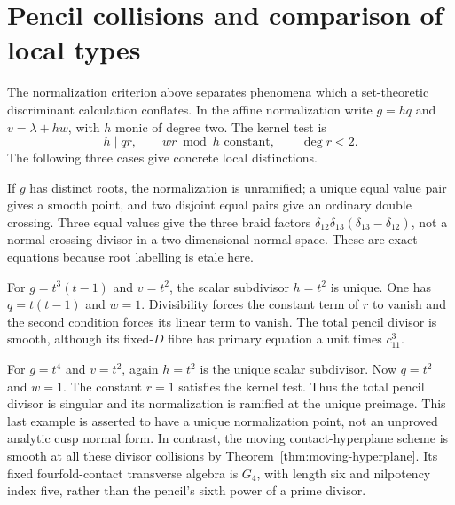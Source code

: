 \section{Pencil collisions and comparison of local types}
\label{sec:pencil-collision-types}
The normalization criterion above separates phenomena which a
set-theoretic discriminant calculation conflates. In the affine
normalization write $g=hq$ and $v=\lambda+hw$, with $h$ monic of
degree two. The kernel test is
\[
 h\mid qr,\qquad wr\bmod h\text{ constant},\qquad\deg r<2.
\]
The following three cases give concrete local distinctions.

If $g$ has distinct roots, the normalization is unramified; a unique
equal value pair gives a smooth point, and two disjoint equal pairs
give an ordinary double crossing. Three equal values give the three
braid factors $\delta_{12}\delta_{13}(\delta_{13}-\delta_{12})$,
not a normal-crossing divisor in a two-dimensional normal space.
These are exact equations because root labelling is etale here.

For $g=t^3(t-1)$ and $v=t^2$, the scalar subdivisor $h=t^2$ is unique.
One has $q=t(t-1)$ and $w=1$. Divisibility forces the constant term
of $r$ to vanish and the second condition forces its linear term to
vanish. The total pencil divisor is smooth, although its fixed-$D$
fibre has primary equation a unit times $c_{11}^3$.

For $g=t^4$ and $v=t^2$, again $h=t^2$ is the unique scalar
subdivisor. Now $q=t^2$ and $w=1$. The constant $r=1$ satisfies the
kernel test. Thus the total pencil divisor is singular and its
normalization is ramified at the unique preimage. This last example
is asserted to have a unique normalization point, not an unproved
analytic cusp normal form. In contrast, the moving contact-hyperplane
scheme is smooth at all these divisor collisions by
Theorem~\ref{thm:moving-hyperplane}. Its fixed fourfold-contact
transverse algebra is $G_4$, with length six and nilpotency index
five, rather than the pencil's sixth power of a prime divisor.
